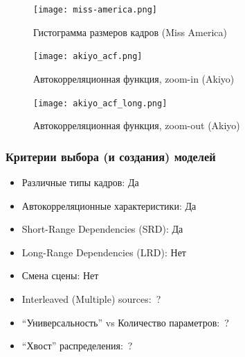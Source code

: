 \documentclass[10pt,pdf,hyperref={unicode}]{beamer}
\begin{document}
\begin{frame}
    \begin{figure}[h]
        \begin{center}
            \texttt{[image: miss-america.png]}
        \end{center}
        \caption{Гистограмма размеров кадров (Miss America)}
        \label{fig:miss_america_hist}
    \end{figure}
\end{frame}

\begin{frame}
    \begin{figure}[h]
        \begin{center}
            \texttt{[image: akiyo\_acf.png]}
        \end{center}
        \caption{Автокорреляционная функция, zoom-in (Akiyo)}
        \label{fig:akiyo_acf}
    \end{figure}
\end{frame}

\begin{frame}
    \begin{figure}[h]
        \begin{center}
            \texttt{[image: akiyo\_acf\_long.png]}
        \end{center}
        \caption{Автокорреляционная функция, zoom-out (Akiyo)}
        \label{fig:akiyo_acf_long}
    \end{figure}
\end{frame}

\begin{frame}
    \frametitle{Критерии выбора (и создания) моделей}
    \begin{itemize}
        \item Различные типы кадров: Да
        \item Автокорреляционные характеристики: Да
        \item Short-Range Dependencies (SRD): Да
        \item Long-Range Dependencies (LRD): Нет
        \item Смена сцены: Нет
        \item Interleaved (Multiple) sources:~?
        \item ``Универсальность'' vs Количество параметров:~?
        \item ``Хвост'' распределения:~?
    \end{itemize}
\end{frame}
\end{document}
